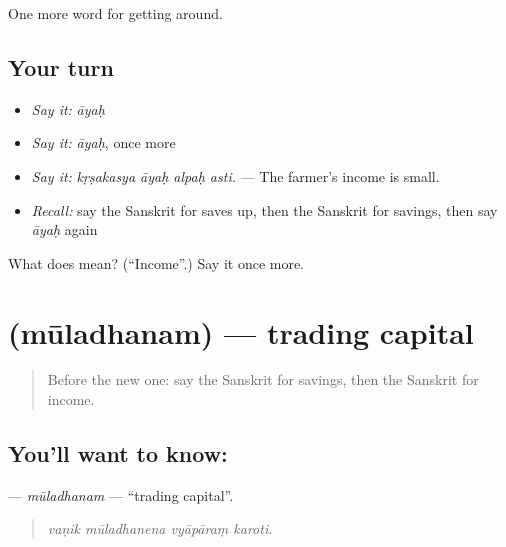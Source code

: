 \begin{grammarlens}[title={What you've built}]
One more word for getting around.
\end{grammarlens}

\subsection*{Your turn}
\begin{itemize}
\raggedright
  \item \emph{Say it:} \emph{āyaḥ}
  \item \emph{Say it:} \emph{āyaḥ}, once more
  \item \emph{Say it:} \emph{kṛṣakasya āyaḥ alpaḥ asti.} — The farmer's income is small.
  \item \emph{Recall:} say the Sanskrit for saves up, then the Sanskrit for savings, then say \emph{āyaḥ} again
\end{itemize}

\begin{tcolorbox}[breakable,colback=teal!4,colframe=teal!35!black,title={Before you move on}]
What does  mean? (\textquotedblleft{}Income\textquotedblright{}.) Say it once more.
\end{tcolorbox}
\section[\texorpdfstring{\sk{मूलधनम्} (mūladhanam)}{मूलधनम् (mūladhanam)}]{ (mūladhanam) — trading capital}

\label{lesson:SA-C433-muladhanam}



\begin{quote}
Before the new one: say the Sanskrit for savings, then the Sanskrit for income.
\end{quote}

\subsection*{You'll want to know: }
\textbf{} — \emph{mūladhanam} — \textquotedblleft{}trading capital\textquotedblright{}.

\begin{quote}
   
\end{quote}

\begin{quote}
\emph{vaṇik mūladhanena vyāpāraṃ karoti.}
\end{quote}


